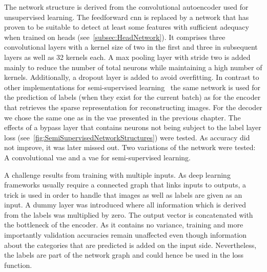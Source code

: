 \bigskip
The network structure is derived from the convolutional autoencoder used for unsupervised learning. The feedforward  \acrshort{cnn} is replaced by a network that has proven to be suitable to detect at least some features with sufficient adequacy when trained on heads (see~\autoref{subsec:HeadNetwork}). It comprises three convolutional layers with a kernel size of two in the first and three in subsequent layers as well as 32 kernels each. A max pooling layer with stride two is added mainly to reduce the number of total neurons while maintaining a high number of kernels. Additionally, a dropout layer is added to avoid overfitting. In contrast to other implementations for semi-supervised learning~\citep{keng2017semi} the same network is used for the prediction of labels (when they exist for the current batch) as for the encoder that retrieves the sparse representation for reconstructing images. For the decoder we chose the same one as in the \acrlong{vae} presented in the previous chapter. The effects of a bypass layer that contains neurons not being subject to the label layer loss (see~\autoref{fig:SemiSupervisedNetworkStructures}) were tested. As accuracy did not improve, it was later missed out. Two variations of the network were tested: A convolutional \acrlong{vae} and a \acrlong{vae} for semi-supervised learning.

A challenge results from training with multiple inputs. As deep learning frameworks usually require a connected graph that links inputs to outputs, a trick is used in order to handle that images as well as labels are given as an input. A dummy layer was introduced where all information which is derived from the labels was multiplied by zero. The output vector is concatenated with the bottleneck of the encoder. As it contains no variance, training and more importantly validation accuracies remain unaffected even though information about the categories that are predicted is added on the input side. Nevertheless, the labels are part of the network graph and could hence be used in the loss function.

